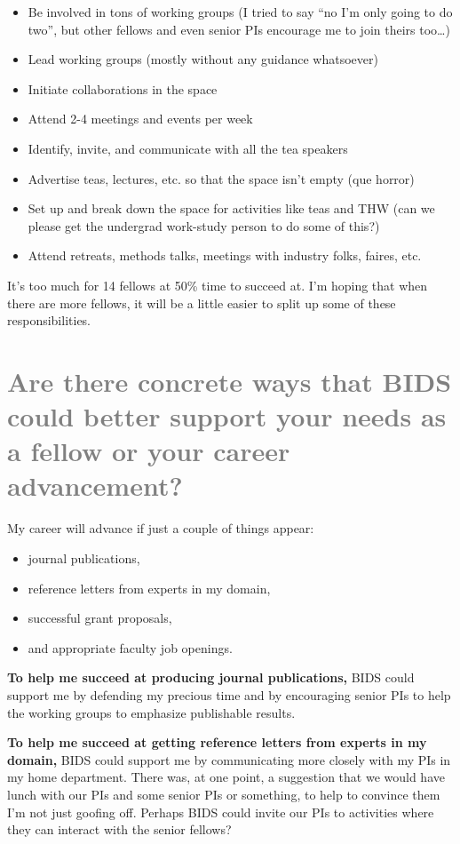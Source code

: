 \documentclass[a4paper, 10pt]{article}
\begin{document}
\begin{itemize}
\item Be involved in tons of working groups (I tried to say ``no I'm only going
to do two'', but other fellows and even senior PIs encourage me to join theirs
too\ldots)
\item Lead working groups (mostly without any guidance whatsoever)
\item Initiate collaborations in the space
\item Attend 2-4 meetings and events per week
\item Identify, invite, and communicate with all the tea speakers
\item Advertise teas, lectures, etc. so that the space isn't empty (que horror)
\item Set up and break down the space for activities like teas and THW (can we please get the undergrad work-study person to do some of this?)
\item Attend retreats, methods talks, meetings with industry folks, faires, etc.
\end{itemize}

It's too much for 14 fellows at 50\% time to succeed at. I'm hoping that when
there are more fellows, it will be a little easier to split up some of these
responsibilities.



\section{\textcolor{gray}{Are there concrete ways that BIDS could better
support your needs as a fellow or your career advancement?}}

My career will advance if just a couple of things appear:
\begin{itemize}
\item journal publications,
\item reference letters from experts in my domain,
\item successful grant proposals,
\item and appropriate faculty job openings.
\end{itemize}

\textbf{To help me succeed at producing journal publications,} BIDS could
support me by defending my precious time and by encouraging senior PIs to help
the working groups to emphasize publishable results.

\textbf{To help me succeed at getting reference letters from experts in my
domain,} BIDS could support me by communicating more closely with my PIs in my
home department. There was, at one point, a suggestion that we would have lunch
with our PIs and some senior PIs or something, to help to convince them I'm not
just goofing off. Perhaps BIDS could invite our PIs to activities where they
can interact with the senior fellows?
\end{document}
